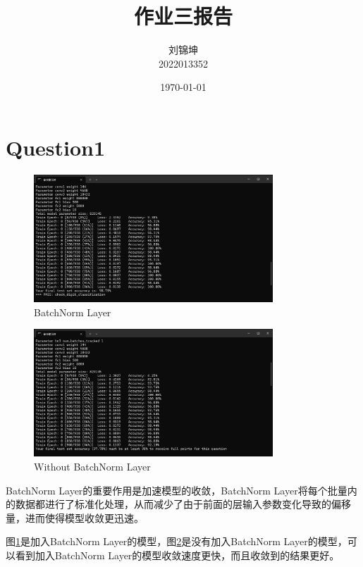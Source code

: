 \documentclass[UTF8]{ctexart}
\title{作业三报告}
\author{
    刘锦坤
    \\2022013352}
\date{\today}
\begin{document}
\fancyfoot[C]{\thepage}

\maketitle

\section{Question1}

\begin{figure}[h]
    \centering
    \includegraphics[width=0.8\textwidth]{./image/Batch.png}
    \caption{BatchNorm Layer}
    \label{fig:Batch}
\end{figure}

\begin{figure}[h]
    \centering
    \includegraphics[width=0.8\textwidth]{./image/NoBatch.png}
    \caption{Without BatchNorm Layer}
    \label{fig:NoBatch}
\end{figure}

BatchNorm Layer的重要作用是加速模型的收敛，BatchNorm Layer将每个批量内的数据都进行了标准化处理，从而减少了由于前面的层输入参数变化导致的偏移量，进而使得模型收敛更迅速。

图\ref{fig:Batch}是加入BatchNorm Layer的模型，图\ref{fig:NoBatch}是没有加入BatchNorm Layer的模型，可以看到加入BatchNorm Layer的模型收敛速度更快，而且收敛到的结果更好。
\end{document}
